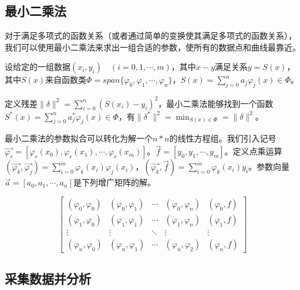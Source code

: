\documentclass{article}
\begin{document}
\begin{multicols}{2}
            \subsection{最小二乘法}
                对于满足多项式的函数关系（或者通过简单的变换使其满足多项式的函数关系），我们可以使用最小二乘法来求出一组合适的参数，使所有的数据点和曲线最靠近。
                
                设给定的一组数据$(x_{i},y_{i})\quad(i=0,1,\cdots,m)$，其中$x-y$满足关系$y=S(x)$，其中$S(x)$来自函数类$\Phi=span\lbrace\varphi_{0},\varphi_{1},\cdots,\varphi_{n}\rbrace$，$S(x)=\sum_{j=0}^{n}a_{j}\varphi_{j}(x)\in\Phi$。

                定义残差$\parallel\delta\parallel^{2}=\sum_{i=0}^{n}(S(x_{i})-y_{i})^{2}$，最小二乘法能够找到一个函数$S^{*}(x)=\sum_{j=0}^{n}a_{j}^{*}\varphi_{j}(x)\in\Phi$，有$\parallel\delta^{*}\parallel^{2}=\min_{S(x)\in\Phi}=\parallel\delta\parallel^{2}$。

                最小二乘法的参数拟合可以转化为解一个$n*n$的线性方程组。我们引入记号$\vec{\varphi_{r}}=[\varphi_{r}(x_{0}),\varphi_{r}(x_{1}),\cdots,\varphi_{r}(x_{m})]$。$\vec{f}=[y_{0},y_{1},\cdots,y_{m}]$。定义点乘运算$(\vec{\varphi_{k}},\vec{\varphi_{j}})=\sum_{i=0}^{m}\varphi_{k}(x_i)\varphi_{j}(x_i)$，$(\vec{\varphi_{k}},\vec{f})=\sum_{i=0}^{m}\varphi_{k}(x_i)y_i$。参数向量$\vec{a}=[a_0,a_1,\cdots,a_n]$是下列增广矩阵的解。

                \begin{equation}
                    \left[
                        \begin{array}{ccccc}
                            (\varphi_{0},\varphi_{0}) & (\varphi_{0},\varphi_{1}) & \cdots & (\varphi_{0},\varphi_{n}) & (\varphi_{0},f) \\
                            (\varphi_{1},\varphi_{0}) & (\varphi_{1},\varphi_{1}) & \cdots & (\varphi_{1},\varphi_{n}) & (\varphi_{1},f) \\
                            \vdots & \vdots & \ddots & \vdots & \vdots \\
                            (\varphi_{n},\varphi_{0}) & (\varphi_{n},\varphi_{1}) & \cdots & (\varphi_{n},\varphi_{2}) & (\varphi_{n},f)
                        \end{array}
                    \right]
                \end{equation}

            \subsection{采集数据并分析}



\end{multicols}
\end{document}
